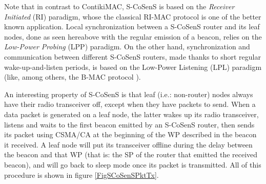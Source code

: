 \documentclass[conference]{IEEEtran}
\begin{document}
Note that in contrast to ContikiMAC, S-CoSenS is based on the \emph{Receiver
Initiated} (RI) paradigm, whose the classical RI-MAC protocol \cite{RIMAC}
is one of the better known application.
Local synchronization between a S-CoSenS router and its leaf nodes, done
as seen hereabove with the regular emission of a beacon, relies on the
\emph{Low-Power Probing} (LPP) paradigm.
On the other hand, synchronization and communication between different
S-CoSenS routers, made thanks to short regular wake-up-and-listen periods,
is based on the Low-Power Listening (LPL) paradigm (like, among others,
the B-MAC protocol \cite{BMAC}).

An interesting property of S-CoSenS is that leaf (i.e.: non-router) nodes
always have their radio transceiver off, except when they have packets
to send. When a data packet is generated on a leaf node, the latter wakes up
its radio transceiver, listens and waits to the first beacon emitted by
an S-CoSenS router, then sends its packet using CSMA/CA at the beginning
of the WP described in the beacon it received. A leaf node will put its
transceiver offline during the delay between the beacon and that WP
(that is: the SP of the router that emitted the received beacon), and
will go back to sleep mode once its packet is transmitted.
All of this procedure is shown in figure \ref{FigSCoSenSPktTx}.
\end{document}
